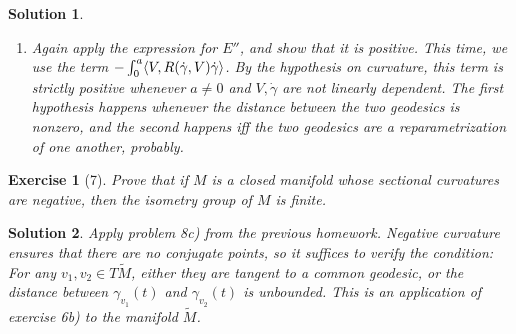 \documentclass{article}
\theoremstyle{plain}
\newtheorem*{ex}{Exercise}
\theoremstyle{nonumberplain}
\newtheorem{sol}{Solution}
\DeclarePairedDelimiter{\braket}{\langle}{\rangle}
\begin{document}
\begin{sol}
\begin{enumerate}
\smallskip

To do the second part of this question, simply apply exercise 1. from do Carmo, using the fact that (near $\pi_\gamma(p)$) the geodesic $\gamma$ looks like an embedded curve. Question 1 gives us that a minimizer for distance is orthogonal to the submanifold, which proves what we want.

\item Again apply the expression for $E''$, and show that it is positive. This time, we use the term $-\int_0^a \braket{V, R(\dot\gamma, V) \dot\gamma}$. By the hypothesis on curvature, this term is strictly positive whenever $a \neq 0$ and $V, \dot\gamma$ are not linearly dependent. The first hypothesis happens whenever the distance between the two geodesics is nonzero, and the second happens iff the two geodesics are a reparametrization of one another, probably.
\end{enumerate}
\end{sol}

\begin{ex}[7]
Prove that if $M$ is a closed manifold whose sectional curvatures are negative, then the isometry group of $M$ is finite.
\end{ex}

\begin{sol}
Apply problem 8c) from the previous homework. Negative curvature ensures that there are no conjugate points, so it suffices to verify the condition: For any $v_1, v_2 \in T \tilde M$, either they are tangent to a common geodesic, or the distance between $\gamma_{v_1}(t)$ and $\gamma_{v_2}(t)$ is unbounded. This is an application of exercise 6b) to the manifold $\tilde M$.
\end{sol}
\end{document}
